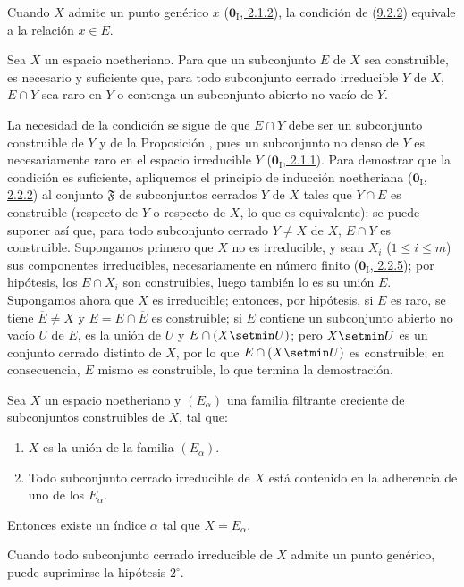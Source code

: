 Cuando $X$ admite un punto genérico $x$
(\hyperref[0.2.1.2-fr]{$\mathbf{0}_{\mathrm I}$, 2.1.2}), la condición de (\hyperref[0.9.2.2-fr]{9.2.2}) equivale a la relación $x\in E$.

\begin{proposition}[9.2.3]
\label{0.9.2.3}
\label{0.9.2.3-fr}
Sea $X$ un espacio noetheriano.
Para que un subconjunto $E$ de $X$ sea construible, es necesario y suficiente que, para todo subconjunto cerrado irreducible $Y$ de $X$, $E\cap Y$ sea raro en $Y$ o contenga un subconjunto abierto no vacío de $Y$.
\end{proposition}


La necesidad de la condición se sigue de que $E\cap Y$ debe ser un subconjunto construible de $Y$ y de la Proposición , pues un subconjunto no denso de $Y$ es necesariamente raro en el espacio irreducible $Y$ (\hyperref[0.2.1.1-fr]{$\mathbf{0}_{\mathrm I}$, 2.1.1}). Para demostrar que la condición es suficiente, apliquemos el principio de inducción noetheriana (\hyperref[0.2.2.2-fr]{$\mathbf{0}_{\mathrm I}$, 2.2.2}) al conjunto
$\mathfrak{F}$ de subconjuntos cerrados $Y$ de $X$ tales que $Y\cap E$ es construible (respecto de $Y$ o respecto de $X$, lo que es equivalente): se puede suponer así que, para todo subconjunto cerrado $Y\ne X$ de $X$, $E\cap Y$ es construible.
Supongamos primero que $X$ no es irreducible, y sean $X_i$ ($1\leq i\leq m$) sus componentes irreducibles, necesariamente en número finito (\hyperref[0.2.2.5-fr]{$\mathbf{0}_{\mathrm I}$, 2.2.5}); por hipótesis, los
$E\cap X_i$ son construibles, luego también lo es su unión $E$.
Supongamos ahora que $X$ es irreducible; entonces, por hipótesis, si $E$ es raro, se tiene $\overline{E}\ne X$ y $E=E\cap\overline{E}$ es construible; si $E$ contiene un subconjunto abierto no vacío $U$ de $E$, es la unión de $U$ y $E\cap(X\setmin U)$; pero $X\setmin U$ es un conjunto cerrado distinto de $X$, por lo que $E\cap(X\setmin U)$ es construible; en consecuencia, $E$ mismo es construible, lo que termina la demostración.


\begin{corollary}[9.2.4]
\label{0.9.2.4}
\label{0.9.2.4-fr}
Sea $X$ un espacio noetheriano y $(E_\alpha)$ una familia filtrante creciente de subconjuntos construibles de $X$, tal que:
\begin{enumerate}
  \item[$1^\circ$] $X$ es la unión de la familia $(E_\alpha)$.
  \item[$2^\circ$] Todo subconjunto cerrado irreducible de $X$ está contenido en la adherencia de uno de los $E_\alpha$.
\end{enumerate}

Entonces existe un índice $\alpha$ tal que $X=E_\alpha$.

Cuando todo subconjunto cerrado irreducible de $X$ admite un punto genérico, puede suprimirse la hipótesis $2^\circ$.
\end{corollary}

